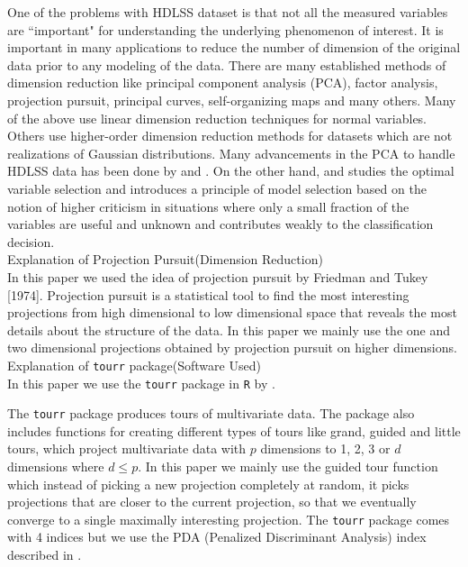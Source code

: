 \documentclass[12]{article}
\begin{document}
One of the problems with HDLSS dataset is that not all the measured variables are ``important" for understanding the underlying phenomenon of interest. It is important in many applications to reduce the number of dimension of the original data prior to any modeling of the data. There are many established methods of dimension reduction like principal component analysis (PCA), factor analysis, projection pursuit, principal curves, self-organizing maps and many others. Many of the above use linear dimension reduction techniques for normal variables. Others use higher-order dimension reduction methods for datasets which are not realizations of Gaussian distributions.  Many advancements in the PCA to handle HDLSS data has been done by \cite{marron:2011} and \cite{yata:2010}. On the other hand, \cite{donoho:2009} and \cite{donoho:2008} studies the optimal variable selection and introduces a principle of model selection based on the notion of higher criticism in situations where only a small fraction of the variables are useful and unknown and contributes weakly to the classification decision.\\
{\color{red} Explanation of Projection Pursuit(Dimension Reduction)} \\
In this paper we used the idea of projection pursuit by Friedman and Tukey [1974]. Projection pursuit is a statistical tool to find the most interesting projections from high dimensional to low dimensional space that reveals the most details about the structure of the data. In this paper we mainly use the one and two dimensional projections obtained by projection pursuit on higher dimensions. \\
{\color{red} Explanation of \texttt{tourr} package(Software Used)} \\
In this paper we use the \texttt{tourr} package in \texttt{R} \cite{r} by \cite{WC08}. 

The \texttt{tourr} package produces tours of multivariate data. The package also includes functions for creating different types of tours like grand, guided and little tours, which project multivariate data with $p$ dimensions to 1, 2, 3 or $d$ dimensions where $d \le p$. In this paper we mainly use the guided tour function which instead of picking a new projection completely at random, it picks projections that are closer to the current projection, so that we eventually converge to a single maximally interesting projection. The \texttt{tourr} package comes with 4 indices but we use the PDA (Penalized Discriminant Analysis)  index described in \cite{lee:2009}. \\     
\end{document}
